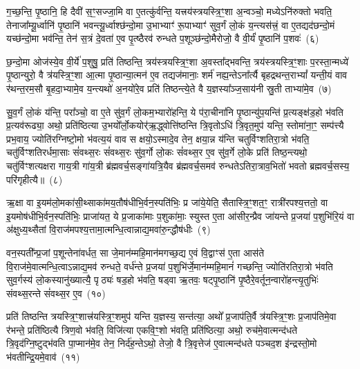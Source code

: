 ग॒च्छ॒न्ति॒ पृ॒ष्ठानि॒ हि दैवी॑ स॒ꣳ॒सज्जा॒मि वा ए॒तत्कु॑र्वन्ति॒ यत्त्रय॑स्त्रयस्त्रि॒ꣳ॒शा अ॒न्वञ्चो॒ मध्ये\-ऽनि॑रुक्तो भवति॒ तेनाजा᳚म्यू॒र्ध्वानि॑ पृ॒ष्ठानि॑ भवन्त्यू॒र्ध्वाश्छ॑न्दो॒मा उ॒भाभ्याꣳ॑ रू॒पाभ्याꣳ॑ सुव॒र्गं लो॒कं य॒न्त्यस॑त्त्रं॒ वा ए॒तद्यद॑छन्दो॒मं यच्छ॑न्दो॒मा भव॑न्ति॒ तेन॑ स॒त्रं दे॒वता॑ ए॒व पृ॒त्ष्ठैरव॑ रुन्धते प॒शूञ्छ॑न्दो॒मैरोजो॒ वै वी॒र्यं॑ पृ॒ष्ठानि॑ प॒शवः॑~(६)

छ॒न्दो॒मा ओज॑स्ये॒व वी॒र्ये॑ प॒शुषु॒ प्रति॑ तिष्ठन्ति॒ त्रय॑स्त्रयस्त्रि॒ꣳ॒शा अ॒वस्ता᳚द्भवन्ति॒ त्रय॑स्त्रयस्त्रि॒ꣳ॒शाः प॒रस्ता॒न्मध्ये॑ पृ॒ष्ठान्युरो॒ वै त्र॑यस्त्रि॒ꣳ॒शा आ॒त्मा पृ॒ष्ठान्या॒त्मन॑ ए॒व तद्यज॑मानाः॒ शर्म॑ नह्य॒न्ते\-ऽना᳚र्त्यै बृहद्रथन्त॒रा\-भ्यां᳚ यन्ती॒यं वाव र॑थन्त॒रम॒सौ बृ॒हदा॒भ्यामे॒व य॒न्त्यथो॑ अ॒नयो॑रे॒व प्रति॑ तिष्ठन्त्ये॒ते वै य॒ज्ञस्या᳚ञ्ज॒साय॑नी स्रु॒ती ताभ्या॑मे॒व~(७)

सु॒व॒र्गं लो॒कं य॑न्ति॒ परा᳚ञ्चो॒ वा ए॒ते सु॑व॒र्गं लो॒कम॒भ्यारो॑हन्ति॒ ये प॑रा॒चीना॑नि पृ॒ष्ठान्यु॑प॒यन्ति॑ प्र॒त्यङ्क्ष॑ड॒हो भ॑वति प्र॒त्यव॑रूढ्या॒ अथो॒ प्रति॑ष्ठित्या उ॒भयो᳚र्लो॒कयोर्॑\mbox{}ऋ॒द्ध्वोत्ति॑ष्ठन्ति त्रि॒वृतो\-ऽधि॑ त्रि॒वृत॒मुप॑ यन्ति॒ स्तोमा॑ना॒ꣳ॒ सम्प॑त्त्यै प्रभ॒वाय॒ ज्योति॑रग्निष्टो॒मो भ॑वत्य॒यं वाव स क्षयो॒\-ऽस्मादे॒व तेन॒ क्षया॒न्न य॑न्ति चतुर्विꣳशतिरा॒त्रो भ॑वति॒ चतु॑र्विꣳशतिरर्धमा॒साः सं॑वथ्स॒रः सं॑वथ्स॒रः सु॑व॒र्गो लो॒कः सं॑वथ्स॒र ए॒व सु॑व॒र्गे लो॒के प्रति॑ तिष्ठ॒न्त्यथो॒ चतु॑र्विꣳशत्यक्षरा गाय॒त्री गा॑य॒त्री ब्र॑ह्मवर्च॒सङ्गा॑यत्रि॒यैव ब्र॑ह्मवर्च॒समव॑ रुन्धते\-ऽतिरा॒त्राव॒भितो॑ भवतो ब्रह्मवर्च॒सस्य॒ परि॑गृहीत्यै॥~(८)

{\anuvakamend[{म॒नु॒ष्य॑स्य मध्य॒तः प॒शव॒स्ताभ्या॑मे॒व सं॑वथ्स॒रश्चतु॑र्विꣳशतिश्च}]}%

ऋ॒क्षा वा इ॒यम॑लो॒मका॑सी॒थ्साका॑मय॒तौष॑धीभि॒र्वन॒स्पति॑भिः॒ प्र जा॑ये॒येति॒ सैतास्त्रि॒ꣳ॒शत॒ꣳ॒ रात्री॑रपश्य॒त्ततो॒ वा इ॒यमोष॑धीभि॒र्वन॒स्पति॑भिः॒ प्राजा॑यत॒ ये प्र॒जाका॑माः प॒शुका॑माः॒ स्युस्त ए॒ता आ॑सीर॒न्प्रैव जा॑यन्ते प्र॒जया॑ प॒शुभि॑रि॒यं वा अ॑क्षुध्य॒थ्सैतां वि॒राज॑मपश्य॒त्तामा॒त्मन्धि॒त्वान्नाद्य॒मवा॑रु॒न्द्धौष॑धीः~(९)

वन॒स्पती᳚न्प्र॒जां प॒शून्तेना॑वर्धत॒ सा जे॒मान॑म्महि॒मान॑मगच्छ॒द्य ए॒वं वि॒द्वाꣳस॑ ए॒ता आस॑ते वि॒राज॑मे॒वात्मन्धि॒त्वा\-ऽन्नाद्य॒मव॑ रुन्धते॒ वर्ध॑न्ते प्र॒जया॑ प॒शुभि॑र्जे॒मान॑म्महि॒मानं॑ गच्छन्ति॒ ज्योति॑रतिरा॒त्रो भ॑वति सुव॒र्गस्य॑ लो॒कस्यानु॑\-ख्यात्यै॒ पृठ्यः॑ षड॒हो भ॑वति॒ षड्वा ऋ॒तवः॒ षट्पृ॒ष्ठानि॑ पृ॒ष्ठैरे॒वर्तून॒न्वारो॑हन्त्यृ॒तुभिः॑ संवथ्स॒रन्ते सं॑वथ्स॒र ए॒व~(१०)

प्रति॑ तिष्ठन्ति त्रयस्त्रि॒ꣳ॒शात्त्र॑यस्त्रि॒ꣳ॒शमुप॑ यन्ति य॒ज्ञस्य॒ सन्त॑त्या॒ अथो᳚ प्र॒जा\-प॑ति॒र्वै त्र॑यस्त्रि॒ꣳ॒शः प्र॒जा\-प॑तिमे॒वा र॑भन्ते॒ प्रति॑ष्ठित्यै त्रिण॒वो भ॑वति॒ विजि॑त्या एकवि॒ꣳ॒शो भ॑वति॒ प्रति॑ष्ठित्या॒ अथो॒ रुच॑मे॒वात्मन्द॑धते त्रि॒वृद॑ग्नि॒ष्टुद्भ॑वति पा॒प्मान॑मे॒व तेन॒ निर्द॑ह॒न्ते\-ऽथो॒ तेजो॒ वै त्रि॒वृत्तेज॑ ए॒वात्मन्द॑धते पञ्चद॒श इ॑न्द्रस्तो॒मो भ॑वतीन्द्रि॒यमे॒वाव॑~(११)


